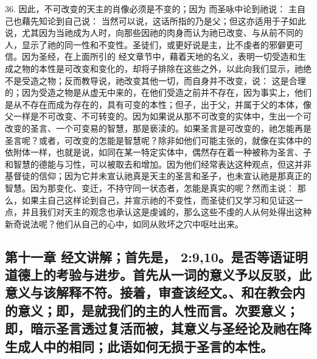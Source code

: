 36. 因此，不可改变的天主的肖像必须是不变的；因为 而圣咏中论到祂说： 主自己也藉先知论到自己说： 当然可以说，这话所指的乃是父；但这亦适用于子如此说，尤其因为当祂成为人时，向那些因祂的肉身而认为祂已改变、与从前不同的人，显示了祂的同一性和不变性。圣徒们，或更好说是主，比不虔者的邪僻更可信。因为圣经，在上面所引的  经文章节中，藉着天地的名义，表明一切受造和生成之物的本性是可改变和变化的，却将子排除在这些之外，以此向我们显示，祂绝不是受造之物；反而教导说，祂改变其他一切，而自身并不改变，说： 这是合理的；因为受造之物是从虚无中来的，在他们受造之前并不存在，因为事实上，他们是从不存在而成为存在的，具有可变的本性；但子，出于父，并属于父的本体，像父一样是不可改变、不可转变的。因为如果说从那不可改变的实体中，生出一个可改变的圣言、一个可变易的智慧，那是亵渎的。如果圣言是可改变的，祂怎能再是圣言呢？或者，可改变的怎能是智慧呢？除非如他们可能主张的，就像在实体中的依附体一样，也就是说，如同在某一特定实体中，偶然存在着一种被称为圣言、子和智慧的德能与习性，可以被取去和增加。因为他们经常表达这种观点，但这并非基督徒的信仰；因为它并未宣认祂真是天主的圣言和圣子，也未宣认祂是那真正的智慧。因为那变化、变迁，不持守同一状态者，怎能是真实的呢？然而主说： 那么，如果主自己这样论到自己，并宣示祂的不变性，而圣徒们又学习和见证这一点，并且我们对天主的观念也承认这是虔诚的，那么这些不虔的人从何处得出这种新奇说法呢？他们从自己的心中，如同从败坏之穴中呕吐出来。\par


\subsection{第十一章 经文讲解；首先是， 2:9,10。是否等语证明道德上的考验与进步。首先从一词的意义予以反驳，此意义与该解释不符。接着，审查该经文。、和在教会内的意义；即，是就我们的主的人性而言。次要意义；即，暗示圣言透过复活而被，其意义与圣经论及祂在降生成人中的相同；此语如何无损于圣言的本性。}

